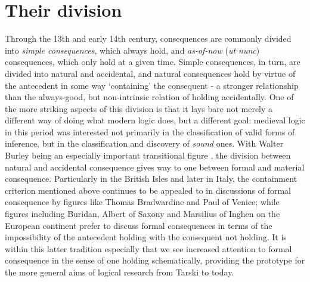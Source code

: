 \documentclass[]{article}
\begin{document}
\section{Their division}
Through the 13th and early 14th century, 
consequences are commonly divided into \emph{simple consequences}, 
which always hold, 
and \emph{as-of-now} (\emph{ut nunc}) consequences, 
which only hold at a given time. 
Simple consequences, 
in turn, 
are divided into natural and accidental, 
and natural consequences hold by virtue of the antecedent in some way `containing' the consequent 
- a stronger relationship than the always-good, 
but non-intrinsic relation of holding accidentally. 
One of the more striking aspects of this division is that it lays bare not merely a different way of doing what modern logic does, 
but a different goal: 
medieval logic in this period was interested not primarily in the classification of valid forms of inference, 
but in the classification and discovery of \emph{sound} ones. 
With Walter Burley being an especially important transitional figure \autocite{Archambault2018b}, 
the division between natural and accidental consequence gives way to one between formal and material consequence. 
Particularly in the British Isles and later in Italy, 
the containment criterion mentioned above continues to be appealed to in discussions of formal consequence by figures like Thomas Bradwardine and Paul of Venice; 
while figures including Buridan, 
Albert of Saxony 
and Marsilius of Inghen on the European continent prefer to discuss formal consequences in terms of the impossibility of the antecedent holding with the consequent not holding. 
It is within this latter tradition especially that we see increased attention to formal consequence 
in the sense of one holding schematically, 
providing the prototype for the more general aims of logical research from Tarski to today. 
\printbibliography
\end{document}
